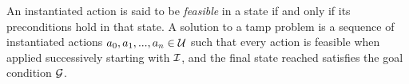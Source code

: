 An instantiated action is said to be \emph{feasible} in a state if and
only if its preconditions hold in that state. A solution to a {\sc
  tamp} problem is a sequence of instantiated actions $a_{0}, a_{1},
..., a_{n} \in \mathcal{U}$ such that every action is feasible when applied
successively starting with $\mathcal{I}$, and the final state reached satisfies the
goal condition $\mathcal{G}$.






